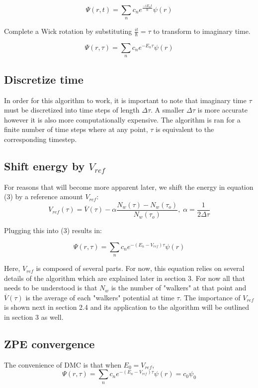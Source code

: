 \documentclass{article}
\begin{document}
\begin{equation} \label{eqn}
\Psi(r,t)=\sum_{n}c_{n}e^{\frac{{-i}E_{n}t}{\hbar}}\psi(r)
\end{equation}

Complete a Wick rotation by substituting $\frac{it}{\hbar}=\tau$ to transform to imaginary time.

\begin{equation} \label{eqn}
\Psi(r,\tau)=\sum_{n}c_{n}e^{-E_{n}\tau}\psi(r)
\end{equation}
\subsection{Discretize time}
In order for this algorithm to work, it is important to note that imaginary time $\tau$ must be discretized into time steps of length $\Delta\tau$. A smaller $\Delta\tau$ is more accurate however it is also more computationally expensive. The algorithm is ran for a finite number of time steps where at any point, $\tau$ is equivalent to the corresponding timestep.

\subsection{Shift energy by $V_{ref}$}
For reasons that will become more apparent later, we shift the energy in equation (3) by  a reference amount $V_{ref}$:
\begin{equation} \label{eqn}
V_{ref}(\tau)=\overline{V}(\tau)-\alpha\frac{N_{w}(\tau)-N_{w}(\tau_{o})}{N_{w}(\tau_{o})},\;\alpha=\frac{1}{2\Delta\tau}
\end{equation}

Plugging this into (3) results in:

\begin{equation} \label{eqn}
\Psi(r,\tau)=\sum_{n}c_{n}e^{-(E_{n}-V_{ref})\tau}\psi(r)
\end{equation}

Here, $V_{ref}$ is composed of several parts. For now, this equation relies on several details of the algorithm which are explained later in section 3. For now all that needs to be understood is that $N_{w}$ is the number of "walkers" at that point and $\overline{V}(\tau)$ is the average of each "walkers" potential at time $\tau$. The importance of $V_{ref}$ is shown next in section 2.4 and its application to the algorithm will be outlined in section 3 as well. 

\subsection{ZPE convergence}
The convenience of DMC is that when $E_{0}=V_{ref}$, 
\begin{equation} \label{eqn}
\Psi(r,\tau)=\sum_{n}c_{n}e^{-(E_{n}-V_{ref})\tau}\psi(r) = c_{0}\psi_{0}
\end{equation}
\end{document}
